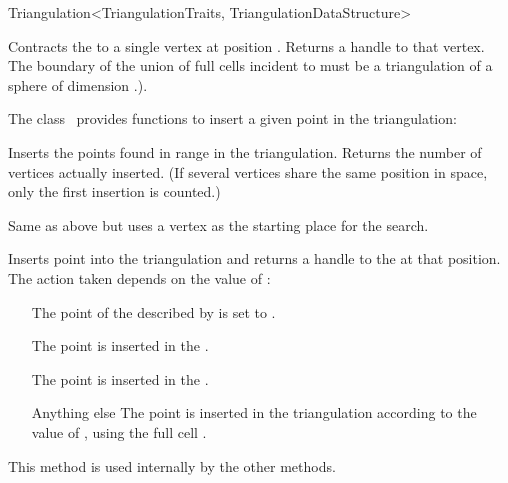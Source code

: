 \begin{ccRefClass}{Triangulation<TriangulationTraits, TriangulationDataStructure>}
\begin{ccAdvanced}

{Contracts the  to a single vertex at position . Returns a
handle to that vertex. 
\ccPrecond The boundary of the union of full cells incident to  must
 be a triangulation of a sphere of dimension
\ccVar.).
}

\end{ccAdvanced}



The class \ccRefName\ provides functions to insert a given point in the
triangulation:

%
{Inserts the points found in range \ccc{[s,e)} in the triangulation. Returns
the number of vertices actually inserted. (If several vertices share the
same position in space, only the first insertion is counted.)}


%
{Same as above but uses a vertex  as the starting place for the search.}

\begin{ccAdvanced}

 {Inserts
point  into the triangulation and returns a handle to the
 at that position. The action taken depends on the value of
:\begin{itemize} \item[\ccc{ON_VERTEX}] The point of the
 described by  is set to . \item[\ccc{IN_FACE}]
The point  is inserted in the . \item[\ccc{IN_FACET}]
The point  is inserted in the . \item[Anything else]
The point  is inserted in the triangulation according to the value
of , using the full cell .\end{itemize} This method is used
internally by the other  methods.}


\end{ccAdvanced}
\end{ccRefClass}

